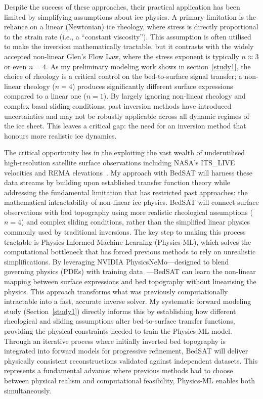 Despite the success of these approaches, their practical application has been limited by simplifying assumptions about ice physics. A primary limitation is the reliance on a linear (Newtonian) ice rheology, where stress is directly proportional to the strain rate (i.e., a ``constant viscosity''). This assumption is often utilised to make the inversion mathematically tractable, but it contrasts with the widely accepted non-linear Glen's Flow Law, where the stress exponent is typically 
$n \approx 3$ or even $n = 4$. As my preliminary modeling work shows in section~\ref{study1}, the choice of rheology is a critical control on the bed-to-surface signal transfer; a non-linear rheology ($n = 4$) produces significantly different surface expressions compared to a linear one ($n = 1$). By largely ignoring non-linear rheology and complex basal sliding conditions, past inversion methods have introduced uncertainties and may not be robustly applicable across all dynamic regimes of the ice sheet. This leaves a critical gap: the need for an inversion method that honours more realistic ice dynamics.

The critical opportunity lies in the exploiting the vast wealth of underutilised high-resolution satellite surface observations including NASA's ITS\_LIVE~\cite{itslive} velocities and REMA elevations~\cite{REMA}. My approach with BedSAT will harness these data streams by building upon established transfer function theory while addressing the fundamental limitation that has restricted past approaches: the mathematical intractability of non-linear ice physics. BedSAT will connect surface observations with bed topography using more realistic rheological assumptions ($n = 4$) and complex sliding conditions, rather than the simplified linear physics commonly used by traditional inversions. The key step to making this process tractable is Physics-Informed Machine Learning (Physics-ML), which solves the computational bottleneck that has forced previous methods to rely on unrealistic simplifications. By leveraging NVIDIA PhysicsNeMo—designed to blend governing physics (PDEs) with training data~\cite{NVIDIA_NeMo_2025}—BedSAT can learn the non-linear mapping between surface expressions and bed topography without linearising the physics. This approach transforms what was previously computationally intractable into a fast, accurate inverse solver. My systematic forward modeling study (Section~\ref{study1}) directly informs this by establishing how different rheological and sliding assumptions alter bed-to-surface transfer functions, providing the physical constraints needed to train the Physics-ML model.
Through an iterative process where initially inverted bed topography is integrated into forward models for progressive refinement, BedSAT will deliver physically consistent reconstructions validated against independent datasets. This represents a fundamental advance: where previous methods had to choose between physical realism and computational feasibility, Physics-ML enables both simultaneously.

